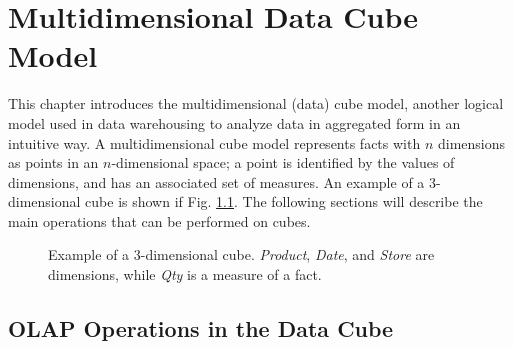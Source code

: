 \chapter{Multidimensional Data Cube Model}

This chapter introduces the multidimensional (data) cube model, another logical model used in data warehousing to analyze data in aggregated form in an intuitive way. A multidimensional cube model represents facts with $n$ dimensions as points in an $n$-dimensional space; a point is identified by the values of dimensions, and has an associated set of measures. An example of a 3-dimensional cube is shown if Fig. \ref{fig:cube_model}. The following sections will describe the main operations that can be performed on cubes.

\begin{figure}[ht]
    \centering
    
    \caption{Example of a 3-dimensional cube. \textit{Product}, \textit{Date}, and \textit{Store} are dimensions, while \textit{Qty} is a measure of a fact.}
    \label{fig:cube_model}
\end{figure}

\section{OLAP Operations in the Data Cube}

